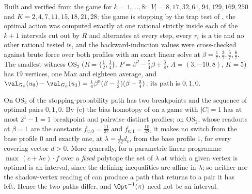 \begin{remark}\label{pp:one-measured}
Built and verified from the game for $k=1,\dots,8$: $|V|=8,17,32,61,94,129,169,250$
and $K=2,4,7,11,15,18,21,28$; the game is stopping by the trap test of
, the optimal action was computed exactly at one rational
strictly inside each of the $k+1$ intervals cut out by $R$ and alternates at
every step, every $r_i$ is a tie and no other rational tested is, and the
backward-induction values were cross-checked against brute force over both
profiles with an exact linear solve at $\beta=\tfrac17,\tfrac37,\tfrac57,\tfrac67$.
The smallest witness $\mathrm{OS}_2$ ($R=\{\tfrac12,\tfrac34\}$, $P=\beta^2-
\tfrac54\beta+\tfrac38$, $A=(3,-10,8)$, $K=5$) has $19$ vertices, one Max and
eighteen average, and
$\val_{G_\beta}(u_0)-\val_{G_\beta}(u_1)=\tfrac14\beta^{5}(\beta-\tfrac12)(\beta-\tfrac34)$;
its path is $0,1,0$.
\end{remark}

\begin{theorem}\label{pp:differ}
On $\mathrm{OS}_2$ of  the stopping-probability path has
two breakpoints and the sequence of optimal pairs $0,1,0$. By
(c) the bias homotopy of  on a game with
$|C|=1$ has at most $2^{1}-1=1$ breakpoint and pairwise distinct profiles; on
$\mathrm{OS}_2$, whose readouts at $\beta=1$ are the constants
$f_{v,0}=\tfrac{11}{32}$ and $f_{v,1}=\tfrac{10}{32}$, it makes no switch from
the base profile $0$ and exactly one, at $\lambda=\tfrac1{32}d_v$, from the base
profile $1$, for every covering vector $d>0$. More generally, for a parametric
linear programme $\max\,(c+\lambda e)\cdot f$ over a \emph{fixed} polytope the
set of $\lambda$ at which a given vertex is optimal is an interval, since the
defining inequalities are affine in $\lambda$; so neither
 nor the shadow-vertex reading of
 can produce a path that returns to a pair it has left.
Hence the two paths differ, and $\Opt^{-1}(\pi)$ need not be an interval.
\end{theorem}

